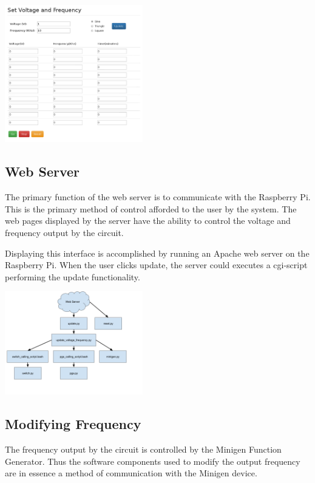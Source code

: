 \documentclass{article}	%
\begin{document}
\begin{multicols}{2}
\begin{center}
\includegraphics[width=0.45\textwidth,keepaspectratio]{web_interface.pdf}
\end{center}

\subsection{Web Server}
The primary function of the web server is to communicate with the Raspberry Pi.
This is the primary method of control afforded 
to the user by the system. 
The web pages displayed by the server
have the ability to control the voltage and frequency output by the circuit.

Displaying this interface is accomplished by 
running an Apache web server on the Raspberry Pi. 
When the user clicks update, the server could executes 
a cgi-script performing the update functionality.

\begin{center}
\includegraphics[width=0.45\textwidth,keepaspectratio]{script_layout.png}
\end{center}

\subsection{Modifying Frequency}
The frequency output by the circuit is controlled 
by the Minigen Function Generator.
Thus the software components used to 
modify the output frequency
are in essence
a method of communication with the Minigen device.


\end{multicols}
\end{document}

